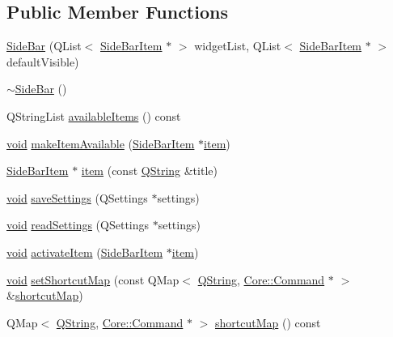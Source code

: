 \subsection*{\-Public \-Member \-Functions}
\begin{DoxyCompactItemize}
\item 
\hyperlink{group___core_plugin_ga5adaad252590a5f4b85707a02e701fd7}{\-Side\-Bar} (\-Q\-List$<$ \hyperlink{class_core_1_1_side_bar_item}{\-Side\-Bar\-Item} $\ast$ $>$ widget\-List, \-Q\-List$<$ \hyperlink{class_core_1_1_side_bar_item}{\-Side\-Bar\-Item} $\ast$ $>$ default\-Visible)
\item 
\hyperlink{group___core_plugin_gab6585fb18d33836f7210a804eb9fcfa0}{$\sim$\-Side\-Bar} ()
\item 
\-Q\-String\-List \hyperlink{group___core_plugin_ga8d31c5b7f76965aee0c0d6aa3cf394eb}{available\-Items} () const 
\item 
\hyperlink{group___u_a_v_objects_plugin_ga444cf2ff3f0ecbe028adce838d373f5c}{void} \hyperlink{group___core_plugin_gaf14b524c0aa8e6f0f088891fab7eda6d}{make\-Item\-Available} (\hyperlink{class_core_1_1_side_bar_item}{\-Side\-Bar\-Item} $\ast$\hyperlink{group___core_plugin_ga1b2a8f4f2070f02f3953f6f60b916b4a}{item})
\item 
\hyperlink{class_core_1_1_side_bar_item}{\-Side\-Bar\-Item} $\ast$ \hyperlink{group___core_plugin_ga1b2a8f4f2070f02f3953f6f60b916b4a}{item} (const \hyperlink{group___u_a_v_objects_plugin_gab9d252f49c333c94a72f97ce3105a32d}{\-Q\-String} \&title)
\item 
\hyperlink{group___u_a_v_objects_plugin_ga444cf2ff3f0ecbe028adce838d373f5c}{void} \hyperlink{group___core_plugin_ga045aee7585eaa788498f20c7c657ddce}{save\-Settings} (\-Q\-Settings $\ast$settings)
\item 
\hyperlink{group___u_a_v_objects_plugin_ga444cf2ff3f0ecbe028adce838d373f5c}{void} \hyperlink{group___core_plugin_gae90b1ee5b104fdf636e303f8c4d082a6}{read\-Settings} (\-Q\-Settings $\ast$settings)
\item 
\hyperlink{group___u_a_v_objects_plugin_ga444cf2ff3f0ecbe028adce838d373f5c}{void} \hyperlink{group___core_plugin_gae360c581c9fa539290c399ffa83abed8}{activate\-Item} (\hyperlink{class_core_1_1_side_bar_item}{\-Side\-Bar\-Item} $\ast$\hyperlink{group___core_plugin_ga1b2a8f4f2070f02f3953f6f60b916b4a}{item})
\item 
\hyperlink{group___u_a_v_objects_plugin_ga444cf2ff3f0ecbe028adce838d373f5c}{void} \hyperlink{group___core_plugin_gad5d0677532b9df5a908a86e8f593e861}{set\-Shortcut\-Map} (const \-Q\-Map$<$ \hyperlink{group___u_a_v_objects_plugin_gab9d252f49c333c94a72f97ce3105a32d}{\-Q\-String}, \hyperlink{class_core_1_1_command}{\-Core\-::\-Command} $\ast$ $>$ \&\hyperlink{group___core_plugin_gafbb7546d9c9f5d420ebda5571d659b88}{shortcut\-Map})
\item 
\-Q\-Map$<$ \hyperlink{group___u_a_v_objects_plugin_gab9d252f49c333c94a72f97ce3105a32d}{\-Q\-String}, \hyperlink{class_core_1_1_command}{\-Core\-::\-Command} $\ast$ $>$ \hyperlink{group___core_plugin_gafbb7546d9c9f5d420ebda5571d659b88}{shortcut\-Map} () const 
\end{DoxyCompactItemize}


